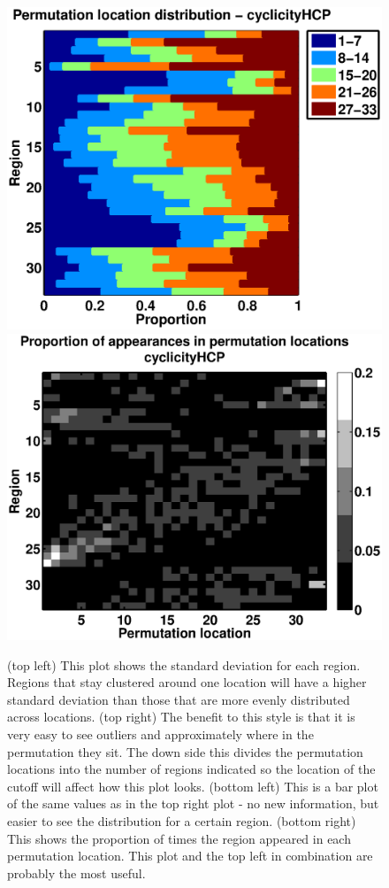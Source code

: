 \documentclass[11pt]{article}
\begin{document}
\begin{figure}
\includegraphics[width=\w\linewidth]{figs/cyclicityHCP_permLocationsbars.eps}
\includegraphics[width=\w\linewidth]{figs/cyclicityHCP_permLocationsgray.eps}
\caption{(top left) This plot shows the standard deviation for each region. Regions that stay clustered around one location will have a higher standard deviation than those that are more evenly distributed across locations. (top right) The benefit to this style is that it is very easy to see outliers and approximately where in the permutation they sit. The down side this divides the permutation locations into the number of regions indicated so the location of the cutoff will affect how this plot looks. (bottom left) This is a bar plot of the same values as in the top right plot - no new information, but easier to see the distribution for a certain region. (bottom right) This shows the proportion of times the region appeared in each permutation location. This plot and the top left in combination are probably the most useful.}
\label{fig:permLocations}
\end{figure}
\end{document}
